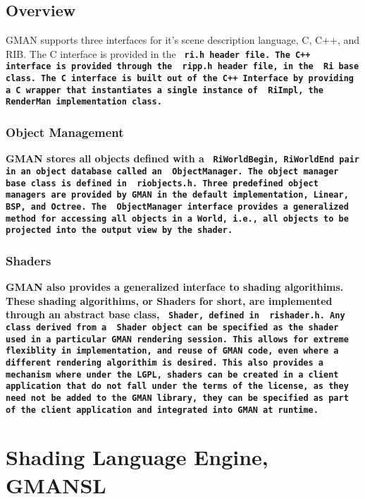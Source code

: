 \documentclass{book}	%
\def\gman{\bf GMAN \rm}
\def\gmansl{\bf GMANSL \rm}
\def\text#1{\bf\tt #1 \rm}
\begin{document}
\section{Overview}

GMAN supports three interfaces for it's scene description language, C,
C++, and RIB.  The C interface is provided in the \text { ri.h }
header file.  The C++ interface is provided through the \text{ ripp.h }
header file, in the \text{ Ri } base class.  The C interface is
built out of the C++ Interface by providing a C wrapper that
instantiates a single instance of \text{ RiImpl, } the RenderMan
implementation class.

\subsection{Object Management}
\gman stores all objects defined with a \text{ RiWorldBegin,
RiWorldEnd } pair in an object database called an \text
{ ObjectManager. }  The object manager base class is defined in \text
{ riobjects.h. }  Three predefined object managers are provided by
\gman in the default implementation, Linear, BSP, and Octree.  The
\text{ ObjectManager } interface provides a generalized method for
accessing all objects in a World, i.e., all objects to be projected
into the output view by the shader.

\subsection{Shaders}
\gman also provides a generalized interface to shading algorithims.
These shading algorithims, or Shaders for short, are implemented
through an abstract base class, \text { Shader, } defined in \text
{ rishader.h. }  Any class derived from a \text { Shader } object can
be specified as the shader used in a particular GMAN rendering
session.  This allows for extreme flexiblity in implementation, and
reuse of \gman code, even where a different rendering algorithim is
desired.  This also provides a mechanism where under the LGPL, shaders
can be created in a client application that do not fall under the
terms of the license, as they need not be added to the \gman library,
they can be specified as part of the client application and integrated
into \gman at runtime.

\chapter{Shading Language Engine, \gmansl}
\end{document}
